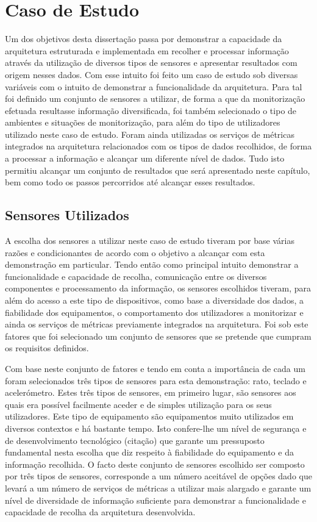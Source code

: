 \chapter{Caso de Estudo}

Um dos objetivos desta dissertação passa por demonstrar a capacidade da arquitetura estruturada e implementada em recolher e processar informação através da utilização de diversos tipos de sensores e apresentar resultados com origem nesses dados. Com esse intuito foi feito um caso de estudo sob diversas variáveis com o intuito de demonstrar a funcionalidade da arquitetura. Para tal foi definido um conjunto de sensores a utilizar, de forma a que da monitorização efetuada resultasse informação diversificada, foi também selecionado o tipo de ambientes e situações de monitorização, para além do tipo de utilizadores utilizado neste caso de estudo. Foram ainda utilizadas os serviços de métricas integrados na arquitetura relacionados com os tipos de dados recolhidos, de forma a processar a informação e alcançar um diferente nível de dados. Tudo isto permitiu alcançar um conjunto de resultados que será apresentado neste capítulo, bem como todo os passos percorridos até alcançar esses resultados.


\section{Sensores Utilizados}

A escolha dos sensores a utilizar neste caso de estudo tiveram por base várias razões e condicionantes de acordo com o objetivo a alcançar com esta demonstração em particular. Tendo então como principal intuito demonstrar a funcionalidade e capacidade de recolha, comunicação entre os diversos componentes e processamento da informação, os sensores escolhidos tiveram, para além do acesso a este tipo de dispositivos, como base a diversidade dos dados, a fiabilidade dos equipamentos, o comportamento dos utilizadores a monitorizar e ainda os serviços de métricas previamente integrados na arquitetura. Foi sob este fatores que foi selecionado um conjunto de sensores que se pretende que cumpram os requisitos definidos.

Com base neste conjunto de fatores e tendo em conta a importância de cada um foram selecionados três tipos de sensores para esta demonstração: rato, teclado e acelerómetro. Estes três tipos de sensores, em primeiro lugar, são sensores aos quais era possível facilmente aceder e de simples utilização para os seus utilizadores. Este tipo de equipamento são equipamentos muito utilizados em diversos contextos e há bastante tempo. Isto confere-lhe um nível de segurança e de desenvolvimento tecnológico (citação) que garante um pressuposto fundamental nesta escolha que diz respeito à fiabilidade do equipamento e da informação recolhida. O facto deste conjunto de sensores escolhido ser composto por três tipos de sensores, corresponde a um número aceitável de opções dado que levará a um número de serviços de métricas a utilizar mais alargado e garante um nível de diversidade de informação suficiente para demonstrar a funcionalidade e capacidade de recolha da arquitetura desenvolvida.

